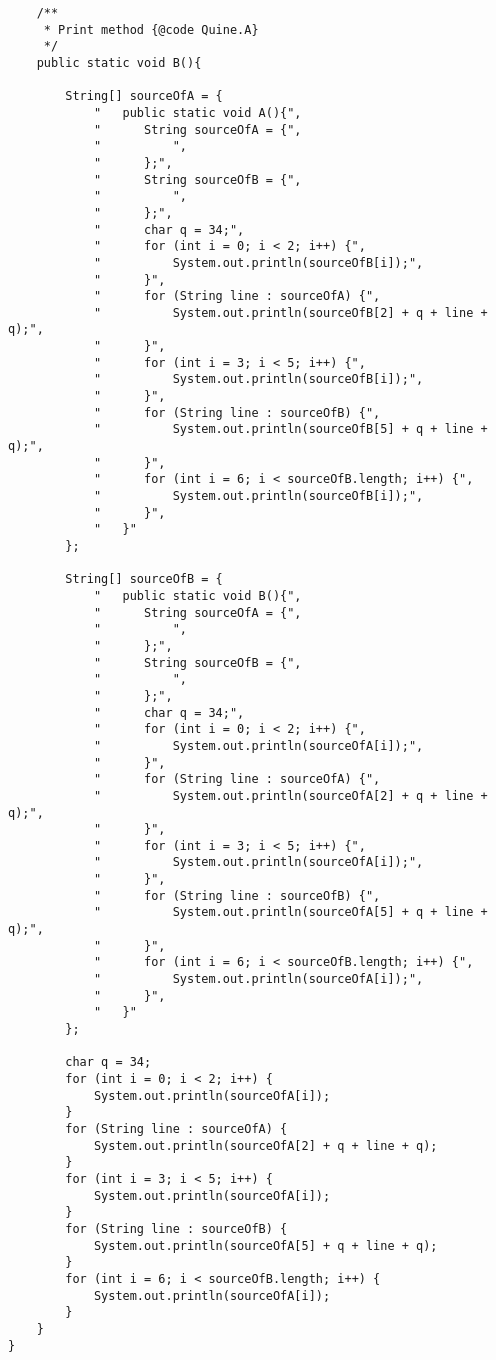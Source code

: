 \documentclass[letterpaper]{article}
\begin{document}
\begin{verbatim}
    /**
     * Print method {@code Quine.A}
     */
    public static void B(){

        String[] sourceOfA = {
            "   public static void A(){",
            "      String sourceOfA = {",
            "          ",
            "      };",
            "      String sourceOfB = {",
            "          ",
            "      };",
            "      char q = 34;",
            "      for (int i = 0; i < 2; i++) {",
            "          System.out.println(sourceOfB[i]);",
            "      }",
            "      for (String line : sourceOfA) {",
            "          System.out.println(sourceOfB[2] + q + line + q);",
            "      }",
            "      for (int i = 3; i < 5; i++) {",
            "          System.out.println(sourceOfB[i]);",
            "      }",
            "      for (String line : sourceOfB) {",
            "          System.out.println(sourceOfB[5] + q + line + q);",
            "      }",
            "      for (int i = 6; i < sourceOfB.length; i++) {",
            "          System.out.println(sourceOfB[i]);",
            "      }",
            "   }"
        };

        String[] sourceOfB = {
            "   public static void B(){",
            "      String sourceOfA = {",
            "          ",
            "      };",
            "      String sourceOfB = {",
            "          ",
            "      };",
            "      char q = 34;",
            "      for (int i = 0; i < 2; i++) {",
            "          System.out.println(sourceOfA[i]);",
            "      }",
            "      for (String line : sourceOfA) {",
            "          System.out.println(sourceOfA[2] + q + line + q);",
            "      }",
            "      for (int i = 3; i < 5; i++) {",
            "          System.out.println(sourceOfA[i]);",
            "      }",
            "      for (String line : sourceOfB) {",
            "          System.out.println(sourceOfA[5] + q + line + q);",
            "      }",
            "      for (int i = 6; i < sourceOfB.length; i++) {",
            "          System.out.println(sourceOfA[i]);",
            "      }",
            "   }"
        };
        
        char q = 34;
        for (int i = 0; i < 2; i++) {
            System.out.println(sourceOfA[i]);
        }
        for (String line : sourceOfA) {
            System.out.println(sourceOfA[2] + q + line + q);
        }
        for (int i = 3; i < 5; i++) {
            System.out.println(sourceOfA[i]);
        }
        for (String line : sourceOfB) {
            System.out.println(sourceOfA[5] + q + line + q);
        }
        for (int i = 6; i < sourceOfB.length; i++) {
            System.out.println(sourceOfA[i]);
        }
    }
}
\end{verbatim}
\newpage
\end{document}
